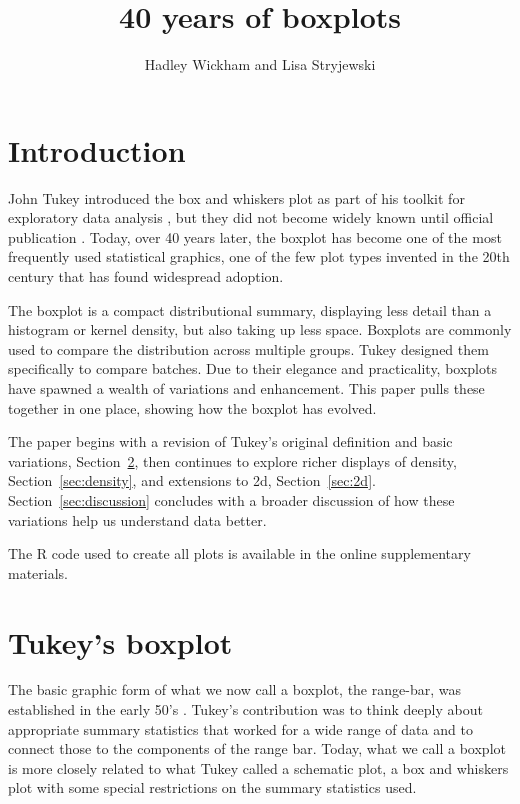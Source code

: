 \documentclass[oneside]{article}
\title{40 years of boxplots}
\author{Hadley Wickham and Lisa Stryjewski}
\begin{document}
\maketitle 

\section{Introduction}

John Tukey introduced the box and whiskers plot as part of his toolkit for  exploratory data analysis \citep{tukey:1970}, but they did not become widely known until official publication \citep{EDA}. Today, over 40 years later, the boxplot has become one of the most frequently used statistical graphics, one of the few plot types invented in the 20th century that has found widespread adoption. 

The boxplot is a compact distributional summary, displaying less detail than a histogram or kernel density, but also taking up less space. Boxplots are commonly used to compare the distribution across multiple groups. Tukey designed them specifically to compare batches. Due to their elegance and practicality, boxplots have spawned a wealth of variations and enhancement. This paper pulls these together in one place, showing how the boxplot has evolved.

The paper begins with a revision of Tukey's original definition and basic variations, Section~\ref{sec:tukey}, then continues to explore richer displays of density, Section~\ref{sec:density}, and extensions to 2d, Section~\ref{sec:2d}. Section~\ref{sec:discussion} concludes with a broader discussion of how these variations help us understand data better.

The R code used to create all plots is available in the online supplementary materials.

\section{Tukey's boxplot}
\label{sec:tukey}

The basic graphic form of what we now call a boxplot, the range-bar, was established in the early 50's \citet[pg. 164]{spear:1952}. Tukey's contribution was to think deeply about appropriate summary statistics that worked for a wide range of data and to connect those to the components of the range bar. Today, what we call a boxplot is more closely related to what Tukey called a schematic plot, a box and whiskers plot with some special restrictions on the summary statistics used. %
\end{document}
